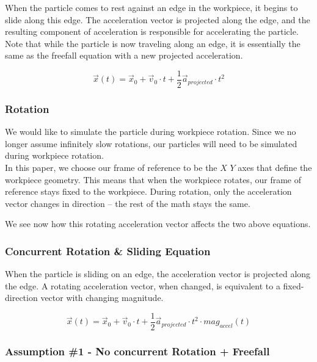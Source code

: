When the particle comes to rest against an edge in the workpiece, it begins to slide along this edge. The acceleration vector is projected along the edge, and the resulting component of acceleration is responsible for accelerating the particle.
\\

Note that while the particle is now traveling along an edge, it is essentially the same as the freefall equation with a new projected acceleration.

$$
\vec{x}(t) = \vec{x}_0 + \vec{v}_{0} \cdot t + \frac{1}{2}\vec{a}_{projected} \cdot t^2
$$


		\subsubsection{Rotation}

We would like to simulate the particle during workpiece rotation. Since we no longer assume infinitely slow rotations, our particles will need to be simulated during workpiece rotation.
\\

In this paper, we choose our frame of reference to be the $X$ $Y$ axes that define the workpiece geometry. This means that when the workpiece rotates, our frame of reference stays fixed to the workpiece. During rotation, only the acceleration vector changes in direction -- the rest of the math stays the same.

We see now how this rotating acceleration vector affects the two above equations.

		\subsubsection{Concurrent Rotation \& Sliding Equation}

When the particle is sliding on an edge, the acceleration vector is projected along the edge. A rotating acceleration vector, when changed, is equivalent to a fixed-direction vector with changing magnitude.

$$
\vec{x}(t) = \vec{x}_0 + \vec{v}_{0} \cdot t + \frac{1}{2}\vec{a}_{projected}  \cdot t^2 \cdot mag_{accel}(t)
$$


		\subsubsection{Assumption \#1 - No concurrent Rotation + Freefall}

